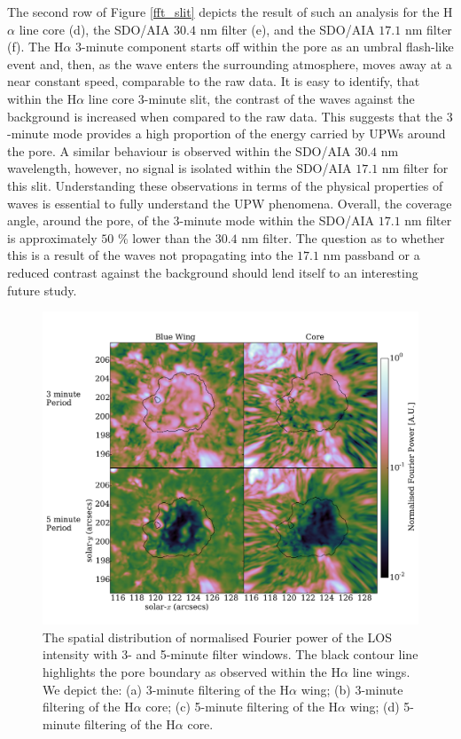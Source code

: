 	The second row of Figure \ref{fft_slit} depicts the result of such an analysis for the H$\alpha$ line core (d), the SDO/AIA $30.4$ nm filter (e), and the SDO/AIA $17.1$ nm filter (f).
	The H$\alpha$ $3$-minute component starts off within the pore as an umbral flash-like event and, then, as the wave enters the surrounding atmosphere, moves away at a near constant speed, comparable to the raw data.
	It is easy to identify, that within the H$\alpha$ line core $3$-minute slit, the contrast of the waves against the background is increased when compared to the raw data.
	This suggests that the $3$-minute mode provides a high proportion of the energy carried by UPWs around the pore.
	A similar behaviour is observed within the SDO/AIA $30.4$ nm wavelength, however, no signal is isolated within the SDO/AIA $17.1$ nm filter for this slit.
	Understanding these observations in terms of the physical properties of waves is essential to fully understand the UPW phenomena.
	Overall, the coverage angle, around the pore, of the $3$-minute mode within the SDO/AIA $17.1$ nm filter is approximately $50$ \% lower than the $30.4$ nm filter.
	The question as to whether this is a result of the waves not propagating into the $17.1$ nm passband or a reduced contrast against the background should lend itself to an interesting future study.

	\begin{figure}
		\centering
		\includegraphics[width=\textwidth]{fft.pdf}
		\caption{
		The spatial distribution of normalised Fourier power of the LOS intensity with 3- and 5-minute filter windows.
		The black contour line highlights the pore boundary as observed within the H$\alpha$ line wings. We depict the:
		(a) 3-minute filtering of the H$\alpha$ wing;
		(b) 3-minute filtering of the H$\alpha$ core;
		(c) 5-minute filtering of the H$\alpha$ wing;
		(d) 5-minute filtering of the H$\alpha$ core.
		}
		\label{fft_power}
	\end{figure}

